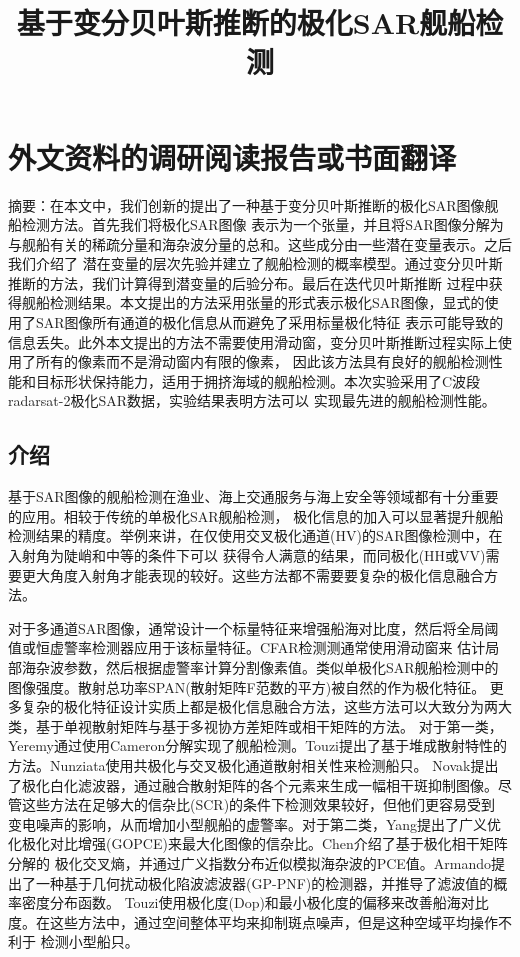 
\chapter{外文资料的调研阅读报告或书面翻译}

\title{基于变分贝叶斯推断的极化SAR舰船检测}

{\heiti 摘要：在本文中，我们创新的提出了一种基于变分贝叶斯推断的极化SAR图像舰船检测方法。首先我们将极化SAR图像
表示为一个张量，并且将SAR图像分解为与舰船有关的稀疏分量和海杂波分量的总和。这些成分由一些潜在变量表示。之后我们介绍了
潜在变量的层次先验并建立了舰船检测的概率模型。通过变分贝叶斯推断的方法，我们计算得到潜变量的后验分布。最后在迭代贝叶斯推断
过程中获得舰船检测结果。本文提出的方法采用张量的形式表示极化SAR图像，显式的使用了SAR图像所有通道的极化信息从而避免了采用标量极化特征
表示可能导致的信息丢失。此外本文提出的方法不需要使用滑动窗，变分贝叶斯推断过程实际上使用了所有的像素而不是滑动窗内有限的像素，
因此该方法具有良好的舰船检测性能和目标形状保持能力，适用于拥挤海域的舰船检测。本次实验采用了C波段radarsat-2极化SAR数据，实验结果表明方法可以
实现最先进的舰船检测性能。}

\section{介绍}
基于SAR图像的舰船检测在渔业、海上交通服务与海上安全等领域都有十分重要的应用。相较于传统的单极化SAR舰船检测，
极化信息的加入可以显著提升舰船检测结果的精度。举例来讲，在仅使用交叉极化通道(HV)的SAR图像检测中，在入射角为陡峭和中等的条件下可以
获得令人满意的结果，而同极化(HH或VV)需要更大角度入射角才能表现的较好。这些方法都不需要要复杂的极化信息融合方法。

对于多通道SAR图像，通常设计一个标量特征来增强船海对比度，然后将全局阈值或恒虚警率检测器应用于该标量特征。CFAR检测测通常使用滑动窗来
估计局部海杂波参数，然后根据虚警率计算分割像素值。类似单极化SAR舰船检测中的图像强度。散射总功率SPAN(散射矩阵F范数的平方)被自然的作为极化特征。
更多复杂的极化特征设计实质上都是极化信息融合方法，这些方法可以大致分为两大类，基于单视散射矩阵与基于多视协方差矩阵或相干矩阵的方法。
对于第一类，Yeremy通过使用Cameron分解实现了舰船检测。Touzi提出了基于堆成散射特性的方法。Nunziata使用共极化与交叉极化通道散射相关性来检测船只。
Novak提出了极化白化滤波器，通过融合散射矩阵的各个元素来生成一幅相干斑抑制图像。尽管这些方法在足够大的信杂比(SCR)的条件下检测效果较好，但他们更容易受到
变电噪声的影响，从而增加小型舰船的虚警率。对于第二类，Yang提出了广义优化极化对比增强(GOPCE)来最大化图像的信杂比。Chen介绍了基于极化相干矩阵分解的
极化交叉熵，并通过广义指数分布近似模拟海杂波的PCE值。Armando提出了一种基于几何扰动极化陷波滤波器(GP-PNF)的检测器，并推导了滤波值的概率密度分布函数。
Touzi使用极化度(Dop)和最小极化度的偏移来改善船海对比度。在这些方法中，通过空间整体平均来抑制斑点噪声，但是这种空域平均操作不利于
检测小型船只。

